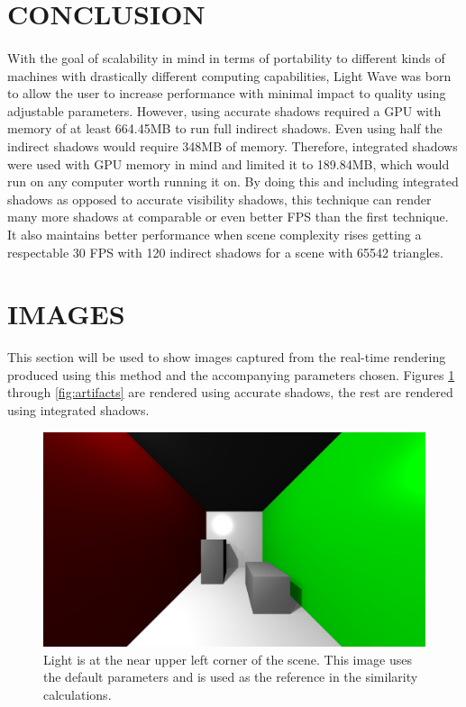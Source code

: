 \section{CONCLUSION}
\paragraph{}
With the goal of scalability in mind in terms of portability to different kinds of machines with drastically different computing capabilities, Light Wave was born to allow the user to increase performance with minimal impact to quality using adjustable parameters.  However, using accurate shadows required a GPU with memory of at least 664.45MB to run full indirect shadows. Even using half the indirect shadows would require 348MB of memory.  Therefore, integrated shadows were used with GPU memory in mind and limited it to 189.84MB, which would run on any computer worth running it on.  By doing this and including integrated shadows as opposed to accurate visibility shadows, this technique can render many more shadows at comparable or even better FPS than the first technique.  It also maintains better performance when scene complexity rises getting a respectable 30 FPS with 120 indirect shadows for a scene with 65542 triangles.

\section{IMAGES}
This section will be used to show images captured from the real-time rendering produced using this method and the accompanying parameters chosen. Figures \ref{fig:defaultimage} through \ref{fig:artifacts} are rendered using accurate shadows, the rest are rendered using integrated shadows.

\begin{figure}[h!]
  \centering
    \includegraphics[width=1.0\textwidth]{sample1.jpg}
  \caption{Light is at the near upper left corner of the scene. This image uses the default parameters and is used as the reference in the similarity calculations.}
	\label{fig:defaultimage}
\end{figure}


